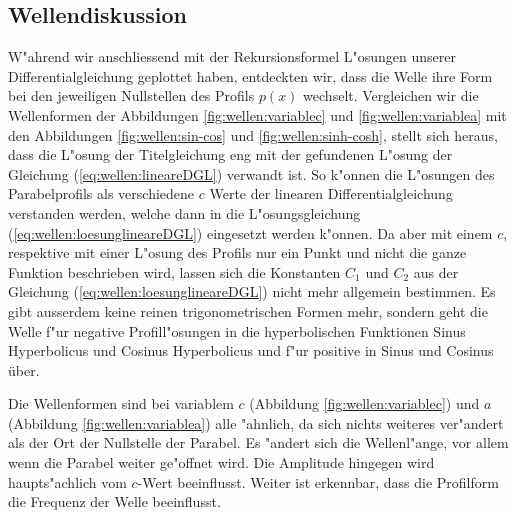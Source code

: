 \subsection{Wellendiskussion}
\label{sec:wellen:diskussionwellenform}
W"ahrend wir anschliessend mit der Rekursionsformel L"osungen unserer 
Differentialgleichung geplottet haben, entdeckten wir, dass die Welle ihre Form 
bei den jeweiligen Nullstellen des Profils $p(x)$ wechselt. Vergleichen wir die 
Wellenformen der Abbildungen \ref{fig:wellen:variablec} und 
\ref{fig:wellen:variablea} mit den Abbildungen \ref{fig:wellen:sin-cos} und 
\ref{fig:wellen:sinh-cosh}, stellt sich heraus, dass die L"osung der 
Titelgleichung eng mit der gefundenen L"osung der Gleichung 
(\ref{eq:wellen:lineareDGL}) verwandt ist. So k"onnen die L"osungen des 
Parabelprofils als verschiedene $c$ Werte der linearen Differentialgleichung 
verstanden werden, welche dann in die L"osungsgleichung 
(\ref{eq:wellen:loesunglineareDGL}) eingesetzt werden k"onnen. 
Da aber mit einem $c$, respektive mit einer L"osung des Profils nur ein Punkt 
und nicht die ganze Funktion beschrieben wird, lassen sich die Konstanten $C_1$ 
und $C_2$ aus der Gleichung (\ref{eq:wellen:loesunglineareDGL}) nicht mehr 
allgemein bestimmen. Es gibt ausserdem keine reinen trigonometrischen Formen 
mehr, sondern geht die Welle f"ur negative Profill"osungen in die 
hyperbolischen Funktionen Sinus Hyperbolicus und Cosinus Hyperbolicus und f"ur 
positive in Sinus und Cosinus über.

Die Wellenformen sind bei variablem $c$ (Abbildung \ref{fig:wellen:variablec}) 
und $a$ (Abbildung \ref{fig:wellen:variablea}) alle "ahnlich, da sich nichts 
weiteres ver"andert als der Ort der Nullstelle der Parabel. Es "andert sich die 
Wellenl"ange, vor allem wenn die Parabel weiter ge"offnet wird. Die Amplitude 
hingegen wird haupts"achlich vom $c$-Wert beeinflusst. Weiter ist erkennbar, 
dass die Profilform die Frequenz der Welle beeinflusst.


